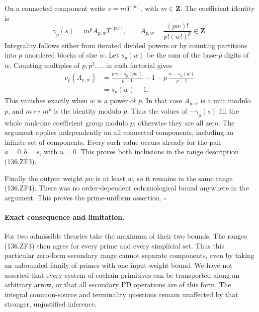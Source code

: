 On a connected component write \(s=mT^{[w]}\), with \(m\in\mathbf Z\).
The coefficient identity is
\[
 \gamma_p(s)=m^p A_{p,w}T^{[pw]},
 \qquad
 A_{p,w}=\frac{(pw)!}{p!(w!)^p}\in\mathbf Z .
 \tag{136.ZF7}
\]
Integrality follows either from iterated divided powers or by
counting partitions into \(p\) unordered blocks of size \(w\).
Let \(s_p(w)\) be the sum of the base-\(p\) digits of \(w\).
Counting multiples of \(p,p^2,\ldots\) in each factorial gives
\[
 \begin{split}
 v_p(A_{p,w})
 &=\frac{pw-s_p(pw)}{p-1}-1
       -p\,\frac{w-s_p(w)}{p-1}\\
 &=s_p(w)-1 .
 \end{split}
 \tag{136.ZF8}
\]
This vanishes exactly when \(w\) is a power of \(p\).
In that case \(A_{p,w}\) is a unit modulo \(p\), and
\(m\mapsto m^p\) is the identity modulo \(p\). Thus the values
of \(-\gamma_p(s)\) fill the whole rank-one coefficient group
modulo \(p\); otherwise they are all zero. The argument applies
independently on all connected components, including an infinite
set of components. Every such value occurs already for the
pair \(a=0,b=s\), with \(u=0\). This proves both inclusions in
the range description (136.ZF3).

Finally the output weight \(pw\) is at least \(w\), so it remains
in the same range (136.ZF4). There was no order-dependent
cohomological bound anywhere in the argument. This proves the
prime-uniform assertion. \(\square\)

\paragraph{Exact consequence and limitation.}
For two admissible theories take the maximum of their two bounds.
The ranges (136.ZF3) then agree for every prime and every
simplicial set. Thus this particular zero-form secondary range
cannot separate components, even by taking an unbounded family
of primes with one input-weight bound. We have not asserted
that every system of cochain primitives can be transported along
an arbitrary arrow, or that all secondary PD operations are of
this form. The integral common-source and terminality questions
remain unaffected by that stronger, unjustified inference.
